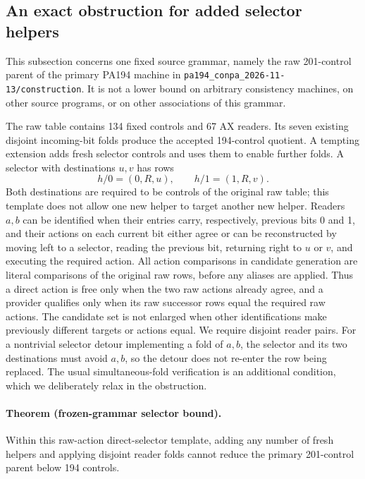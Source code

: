 \subsection{An exact obstruction for added selector helpers}
\label{sec:selector-helper-obstruction}

This subsection concerns one fixed source grammar, namely the raw
201-control parent of the primary PA194 machine in
\texttt{pa194\_conpa\_2026-11-13/construction}. It is not a lower bound on
arbitrary consistency machines, on other source programs, or on other
associations of this grammar.

The raw table contains 134 fixed controls and 67 AX readers. Its seven
existing disjoint incoming-bit folds produce the accepted 194-control
quotient. A tempting extension adds fresh selector controls and uses them
to enable further folds. A selector with destinations $u,v$ has rows
\[
       h/0=(0,R,u),\qquad h/1=(1,R,v).
\]
Both destinations are required to be controls of the original raw table;
this template does not allow one new helper to target another new helper.
Readers $a,b$ can be identified when their entries carry, respectively,
previous bits 0 and 1, and their actions on each current bit either agree
or can be reconstructed by moving left to a selector, reading the previous
bit, returning right to $u$ or $v$, and executing the required action.
All action comparisons in candidate generation are literal comparisons of
the original raw rows, before any aliases are applied. Thus a direct
action is free only when the two raw actions already agree, and a provider
qualifies only when its raw successor rows equal the required raw actions.
The candidate set is not enlarged when other identifications make
previously different targets or actions equal. We require disjoint reader
pairs. For a nontrivial selector detour implementing a fold of $a,b$, the
selector and its two destinations must avoid $a,b$, so the detour does
not re-enter the row being replaced. The usual simultaneous-fold verification
is an additional condition, which we deliberately relax in the obstruction.

\paragraph{Theorem (frozen-grammar selector bound).}
Within this raw-action direct-selector template, adding any number of fresh helpers
and applying disjoint reader folds cannot reduce the primary 201-control
parent below 194 controls.

